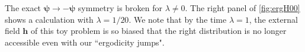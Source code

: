 \documentclass[11pt]{article}
\begin{document}
The exact $\bm\psi\to -\bm \psi$ symmetry is broken for $\lambda\ne0$.  The right panel of \autoref{fig:ergH00} shows a calculation with $\lambda=1/20$.  We note that by the time $\lambda=1$, the external field $\bm h$ of this toy problem is so biased that the right distribution is no longer accessible even with our ``ergodicity jumps".

%
\end{document}
